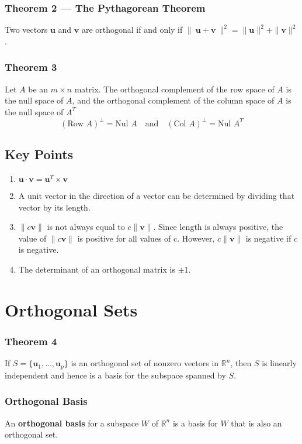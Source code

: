 \documentclass{article}
\begin{document}
\subsubsection*{Theorem 2 --- The Pythagorean Theorem}
Two vectors $\mathbf{u}$ and $\mathbf{v}$ are orthogonal if and only if
$\|\:\mathbf{u}+\mathbf{v}\:\|^2 = \|\mathbf{u}\|^2 + \|\mathbf{v}\|^2$.

\subsubsection*{Theorem 3}
Let $A$ be an $m\times n$ matrix. The orthogonal complement of the row space of $A$ is the null
space of $A$, and the orthogonal complement of the column space of $A$ is the null space of $A^T$
\[{(\text{Row }A)}^\perp = \text{Nul }A\quad\text{and}\quad{(\text{Col }A)}^\perp=\text{Nul }A^T\]

\subsection*{Key Points}
\begin{enumerate}
    \item $\mathbf{u}\cdot\mathbf{v}=\mathbf{u}^T\times \mathbf{v}$
    \item A unit vector in the direction of a vector can be determined by dividing that vector by
    its length.
    \item $\|c\mathbf{v}\|$ is not always equal to $c\|\mathbf{v}\|$. Since length is always
    positive, the value of $\|c\mathbf{v}\|$ is positive for all values of c. However,
    $c\|\mathbf{v}\|$ is negative if $c$ is negative.
    \item The determinant of an orthogonal matrix is $\pm 1$.
\end{enumerate}

\section*{Orthogonal Sets}

\subsubsection*{Theorem 4}
If $S=\{\mathbf{u}_1, \ldots, \mathbf{u}_p\}$ is an orthogonal set of nonzero vectors in
$\mathbb{R}^n$, then $S$ is linearly independent and hence is a basis for the subspace spanned by
$S$.

\subsubsection*{Orthogonal Basis}
An \textbf{orthogonal basis} for a subspace $W$ of $\mathbb{R}^n$ is a basis for $W$ that is also
an orthogonal set.
\end{document}
